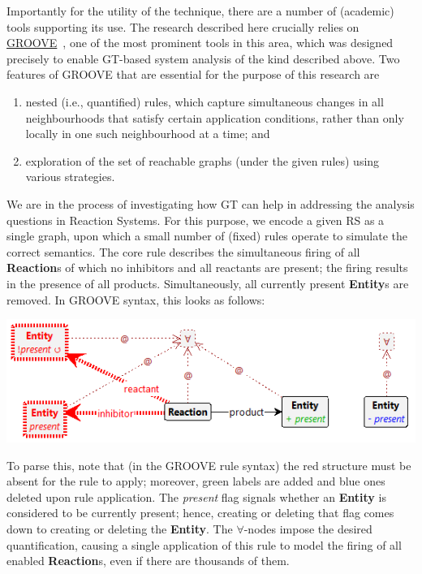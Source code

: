 \documentclass[sn-mathphys-num,a4paper,iicol,lineno,pdflatex]{sn-jnl-hacked}
\newcommand{\lab}[1]{\textsf{#1}}
\newcommand{\blab}[1]{\lab{\bfseries #1}}
\newcommand{\ilab}[1]{\lab{\itshape #1}}
\theoremstyle{thmstyleone}%
\theoremstyle{thmstyletwo}%
\theoremstyle{thmstylethree}%
\begin{document}
Importantly for the utility of the technique, there are a number of (academic) tools supporting its use. The research described here crucially relies on \href{https://groove.cs.utwente.nl}{GROOVE}~\cite{DBLP:journals/sttt/GhamarianMRZZ12}, one of the most prominent tools in this area, which was designed precisely to enable GT-based system analysis of the kind described above. Two features of GROOVE that are essential for the purpose of this research are
\begin{enumerate}%
\item nested (i.e., quantified) rules, which capture simultaneous changes in all neighbourhoods that satisfy certain application conditions, rather than only locally in one such neighbourhood at a time; and
\item exploration of the set of reachable graphs (under the given rules) using various strategies.
\end{enumerate}

We are in the process of investigating how GT can help in addressing the analysis questions in Reaction Systems. For this purpose, we encode a given RS as a single graph, upon which a small number of (fixed) rules operate to simulate the correct semantics. The core rule describes the simultaneous firing of all \blab{Reaction}s of which no \lab{inhibitor}s and all \lab{reactant}s are present; the firing results in the presence of all \lab{product}s. Simultaneously, all currently present \blab{Entity}s are removed. In GROOVE syntax, this looks as follows:

\begin{center}
\includegraphics[scale=.40]{react}
\end{center}

To parse this, note that (in the GROOVE rule syntax) the red structure must be absent for the rule to apply; moreover, green labels are added and blue ones deleted upon rule application. The \ilab{present} flag signals whether an \blab{Entity} is considered to be currently present; hence, creating or deleting that flag comes down to creating or deleting the \blab{Entity}. The $\forall$-nodes impose the desired quantification, causing a single application of this rule to model the firing of all enabled \blab{Reaction}s, even if there are thousands of them.
\end{document}
